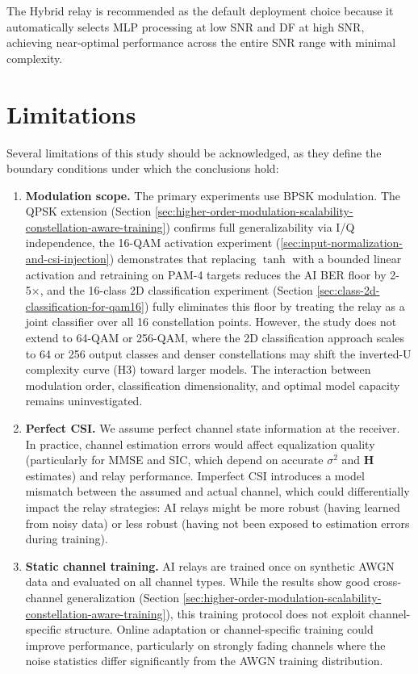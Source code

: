 The Hybrid relay is recommended as the default deployment choice because it automatically selects MLP processing at low SNR and DF at high SNR, achieving near-optimal performance across the entire SNR range with minimal complexity.

\section{Limitations}\label{sec:limitations}

Several limitations of this study should be acknowledged, as they define the boundary conditions under which the conclusions hold:

\begin{enumerate}
\def\labelenumi{\arabic{enumi}.}
\item
  \textbf{Modulation scope.} The primary experiments use BPSK modulation. The QPSK extension (Section \ref{sec:higher-order-modulation-scalability-constellation-aware-training}) confirms full generalizability via I/Q independence, the 16-QAM activation experiment (\ref{sec:input-normalization-and-csi-injection}) demonstrates that replacing \(\tanh\) with a bounded linear activation and retraining on PAM-4 targets reduces the AI BER floor by 2-5×, and the 16-class 2D classification experiment (Section \ref{sec:class-2d-classification-for-qam16}) fully eliminates this floor by treating the relay as a joint classifier over all 16 constellation points. However, the study does not extend to 64-QAM or 256-QAM, where the 2D classification approach scales to 64 or 256 output classes and denser constellations may shift the inverted-U complexity curve (H3) toward larger models. The interaction between modulation order, classification dimensionality, and optimal model capacity remains uninvestigated.
\item
  \textbf{Perfect CSI.} We assume perfect channel state information at the receiver. In practice, channel estimation errors would affect equalization quality (particularly for MMSE and SIC, which depend on accurate \(\sigma^2\) and \(\mathbf{H}\) estimates) and relay performance. Imperfect CSI introduces a model mismatch between the assumed and actual channel, which could differentially impact the relay strategies: AI relays might be more robust (having learned from noisy data) or less robust (having not been exposed to estimation errors during training).
\item
  \textbf{Static channel training.} AI relays are trained once on synthetic AWGN data and evaluated on all channel types. While the results show good cross-channel generalization (Section \ref{sec:higher-order-modulation-scalability-constellation-aware-training}), this training protocol does not exploit channel-specific structure. Online adaptation or channel-specific training could improve performance, particularly on strongly fading channels where the noise statistics differ significantly from the AWGN training distribution.

\end{enumerate}
